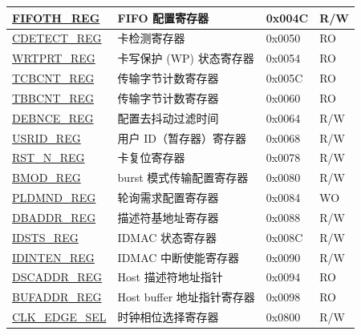\begin{longtable}{ | p{4cm} | p{7.5cm} | p{2cm} | p{1cm} | }
\hyperref[regdesc:FIFOTHREG]{FIFOTH\_REG} & FIFO 配置寄存器 & 0x004C & R/W \\ \hline
\hyperref[regdesc:CDETECTREG]{CDETECT\_REG} & 卡检测寄存器 & 0x0050 & RO \\ \hline
\hyperref[regdesc:WRTPRTREG]{WRTPRT\_REG} & 卡写保护 (WP) 状态寄存器 & 0x0054 & RO \\ \hline
\hyperref[regdesc:TCBCNTREG]{TCBCNT\_REG} & 传输字节计数寄存器 & 0x005C & RO \\ \hline
\hyperref[regdesc:TBBCNTREG]{TBBCNT\_REG} & 传输字节计数寄存器 & 0x0060 & RO \\ \hline
\hyperref[regdesc:DEBNCEREG]{DEBNCE\_REG} & 配置去抖动过滤时间 & 0x0064 & R/W \\ \hline
\hyperref[regdesc:USRIDREG]{USRID\_REG} & 用户 ID（暂存器）寄存器 & 0x0068 & R/W \\ \hline
\hyperref[regdesc:RSTNREG]{RST\_N\_REG} & 卡复位寄存器& 0x0078 & R/W \\ \hline
\hyperref[regdesc:BMODREG]{BMOD\_REG} & burst 模式传输配置寄存器 & 0x0080 & R/W \\ \hline
\hyperref[regdesc:PLDMNDREG]{PLDMND\_REG} & 轮询需求配置寄存器 & 0x0084 & WO \\ \hline
\hyperref[regdesc:DBADDRREG]{DBADDR\_REG} & 描述符基地址寄存器 & 0x0088 & R/W \\ \hline
\hyperref[regdesc:IDSTSREG]{IDSTS\_REG} & IDMAC 状态寄存器 & 0x008C & R/W \\ \hline
\hyperref[regdesc:IDINTENREG]{IDINTEN\_REG} & IDMAC 中断使能寄存器 & 0x0090 & R/W \\ \hline
\hyperref[regdesc:DSCADDRREG]{DSCADDR\_REG} & Host 描述符地址指针 & 0x0094 & RO \\ \hline
\hyperref[regdesc:BUFADDRREG]{BUFADDR\_REG} & Host buffer 地址指针寄存器 & 0x0098 & RO \\ \hline
\hyperref[regdesc:CLKEDGESEL]{CLK\_EDGE\_SEL}& 时钟相位选择寄存器 & 0x0800&R/W \\\hline
\end{longtable}


